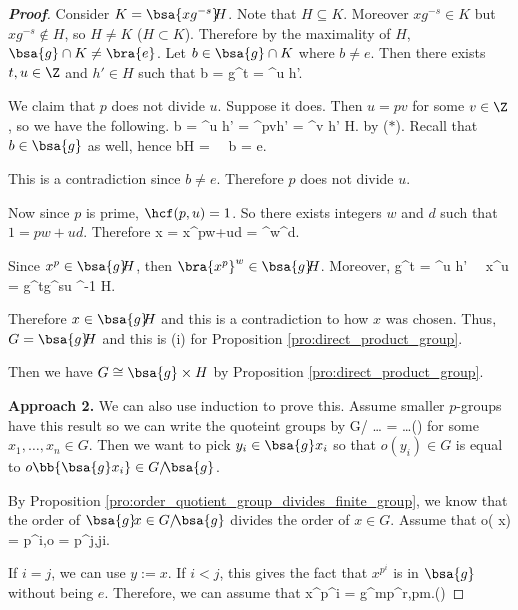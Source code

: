 \begin{proof}[\bf Proof]
Consider $K =\bsa{xg^{-s}}\!\! H$. Note that $H\subseteq K$. Moreover $xg^{-s}\in K$ but $xg^{-s} \notin H$, so $H\neq K$ ($H\subset K$). Therefore by the maximality of $H$, $\bsa{g}\cap K \neq \bra{e}$. Let $b\in \bsa{g}\cap K$ where $b\neq e$. Then there exists $t,u\in \Z$ and $h'\in H$ such that
\be
b = g^t = ^u h'.
\ee

We claim that $p$ does not divide $u$. Suppose it does. Then $u = pv$ for some $v\in \Z$, so we have the following.
\be
b = ^u h' = ^{pv}h' = ^v h' \in H.
\ee
by ($*$). Recall that $b\in \bsa{g}$ as well, hence 
\be
b\in {}\cap H =  \ \ra \ b = e.
\ee

This is a contradiction since $b\neq e$. Therefore $p$ does not divide $u$.

Now since $p$ is prime, $\hcf(p,u)=1$. So there exists integers $w$ and $d$ such that $1 = pw+ud$. Therefore
\be
x = x^{pw+ud} = ^w^d.
\ee

Since $x^p \in \bsa{g}\!\! H$, then $\bra{x^p}^w\in \bsa{g}\!\! H$. Moreover,
\be
g^t = ^u h' \ \ra\ x^u = g^tg^{su} ^{-1} \in {}\!\! H.
\ee

Therefore $x\in \bsa{g}\!\! H$ and this is a contradiction to how $x$ was chosen. Thus, $G = \bsa{g}\!\! H$ and this is (i) for Proposition \ref{pro:direct_product_group}. %

Then we have $G\cong \bsa{g}\times H$ by Proposition \ref{pro:direct_product_group}.%

{\bf Approach 2.} We can also use induction to prove this. Assume smaller $p$-groups have this result so we can write the quoteint groups by 
\be
G/ \cong {} \times \dots \times {}  =  \times \dots \times {}\qquad (\dag) 
\ee 
for some $x_1,\dots,x_n\in G$. Then we want to pick $y_i\in \bsa{g}x_i$ so that $o(y_i)\in G$ is equal to $o\bb{\bsa{g}x_i}\in G/\! \bsa{g}$. 

By Proposition \ref{pro:order_quotient_group_divides_finite_group}, we know that the order of $\bsa{g}\! x \in G/\!\bsa{g}$ divides the order of $x\in G$. Assume that 
\be
o(\! x) = p^i,\quad o = p^j,\qquad j\geq i.
\ee 

If $i = j$, we can use $y :=x$. If $i<j$, this gives the fact that $x^{p^i}$ is in $\bsa{g}$ without being $e$. Therefore, we can assume that 
\be
x^{p^i} = g^{mp^r},\quad p\nmid m.\qquad(\ddag)
\ee


\end{proof}
